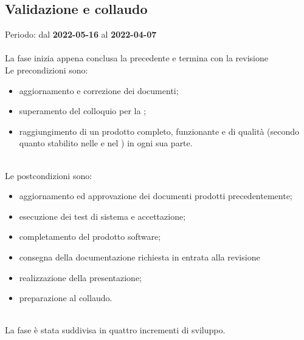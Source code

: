 \subsection{Validazione e collaudo}
Periodo: dal \textbf{2022-05-16} al \textbf{2022-04-07} \mbox{} \\ \mbox{} \\
La fase inizia appena conclusa la precedente e termina con la revisione \CA{} \\
Le precondizioni sono:
\begin{itemize}
 	\item aggiornamento e correzione dei documenti;
 	\item superamento del colloquio per la \PB{};
  	\item raggiungimento di un prodotto completo, funzionante e di qualità (secondo quanto stabilito nelle \NdP{} e nel \PdQ{} ) in ogni sua parte.
\end{itemize} \mbox{} \\
Le postcondizioni sono:
\begin{itemize}
	\item aggiornamento ed approvazione dei documenti prodotti precedentemente;
	\item esecuzione dei test di sistema e accettazione;
	\item completamento del prodotto software;
 	\item consegna della documentazione richiesta in entrata alla revisione \CA{}
	\item realizzazione della presentazione;
 	\item preparazione al collaudo.  
\end{itemize} \mbox{} \\
La fase è stata suddivisa in quattro incrementi di sviluppo.


